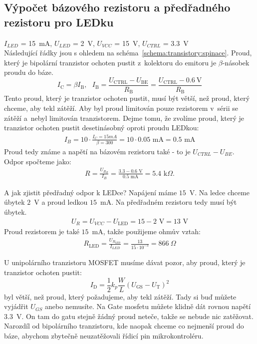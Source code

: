 \documentclass[a4paper,12pt]{article}   %
\begin{document}
\subsection*{Výpočet bázového rezistoru a předřadného rezistoru pro LEDku}
$I_{LED}$ = 15~mA, $U_{LED}$ = 2~V, $U_{VCC}$ = 15~V, $U_{CTRL}$ = 3.3~V\\
Následující řádky jsou s ohledem na schéma~\ref{schema:transistory:spinace}. Proud, který je bipolární tranzistor ochoten pustit z~kolektoru do emitoru je $\beta$-násobek proudu do báze.
\begin{equation*}
    I_\text{C} = \beta I_\text{B}, ~~~I_\text{B} = \frac{U_\text{CTRL} - U_\text{BE}}{R_\text{B}} = \frac{U_\text{CTRL} - 0.6~\text{V}}{R_\text{B}}
\end{equation*}
Tento proud, který je tranzistor ochoten pustit, musí být větší, než proud, který chceme, aby tekl zátěží. Aby byl proud limitován pouze rezistorem v~sérii se zátěží a~nebyl limitován tranzistorem. Dejme tomu, že zvolíme proud, který je tranzistor ochoten pustit desetinásobný oproti proudu LEDkou:
\begin{align*}
    I_B = 10 \cdot \frac{I_C = 15 mA}{\beta = 300} = 10\cdot 0.05\text{ mA} = 0.5\text{ mA}
\end{align*}
Proud tedy známe a napětí na bázovém rezistoru také - to je $U_{CTRL} - U_{BE}$. Odpor spočteme jako:
\begin{align*}
    R = \frac{U_{R_B}}{I_B} = \frac{3.3 - 0.6 \text{ V}}{0.5\text{ mA}} = 5.4\text{ k$\Omega$}.
\end{align*}

A jak zjistit předřadný odpor k LEDce? Napájení máme $15$~V. Na ledce chceme úbytek $2$~V a proud ledkou $15$~mA. Na předřadném rezistoru tedy musí být úbytek.
\begin{align*}
    U_R = U_{VCC} - U_{\text{LED}} = 15 - 2\text{ V} = 13\text{ V}
\end{align*}
Proud rezistorem je také $15$~mA, takže použijeme ohmův vztah:
\begin{align*}
    R_\text{LED} = \frac{U_{R_\text{LED}}}{I_{LED}} = \frac{13}{15\cdot 10^{-3}} = 866~\Omega
\end{align*}


U unipolárního tranzistoru MOSFET musíme dávat pozor, aby proud, který je tranzistor ochoten pustit:
\begin{equation*}
    I_\text{D} = \frac{1}{2}k_p \frac{W}{L} (U_\text{GS} - U_\text{T})^2
\end{equation*}
byl větší, než proud, který požadujeme, aby tekl zátěží. Tady si buď můžete vyjádřit $U_{GS}$ anebo nemusíte. Na Gate mosfetu můžete klidně dát rovnou napětí 3.3~V. On tam do gatu stejně žádný proud neteče, takže se nebude nic zatěžovat. Narozdíl od bipolárního tranzistoru, kde naopak chceme co nejmenší proud do báze, abychom zbytečně neuzatěžovali řídicí pin mikrokontroléru.
\end{document}

